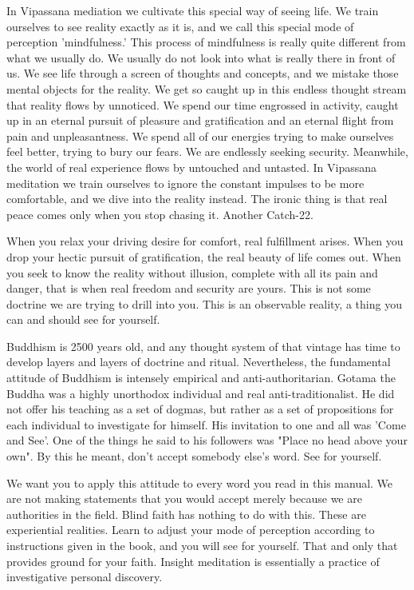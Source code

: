 In Vipassana mediation we cultivate this special way of seeing life. We train
ourselves to see reality exactly as it is, and we call this special mode of
perception 'mindfulness.' This process of mindfulness is really quite different
from what we usually do. We usually do not look into what is really there in
front of us. We see life through a screen of thoughts and concepts, and we
mistake those mental objects for the reality. We get so caught up in this
endless thought stream that reality flows by unnoticed. We spend our time
engrossed in activity, caught up in an eternal pursuit of pleasure and
gratification and an eternal flight from pain and unpleasantness. We spend all
of our energies trying to make ourselves feel better, trying to bury our fears.
We are endlessly seeking security. Meanwhile, the world of real experience flows
by untouched and untasted. In Vipassana meditation we train ourselves to ignore
the constant impulses to be more comfortable, and we dive into the reality
instead. The ironic thing is that real peace comes only when you stop chasing
it. Another Catch-22.

When you relax your driving desire for comfort, real fulfillment arises. When
you drop your hectic pursuit of gratification, the real beauty of life comes
out. When you seek to know the reality without illusion, complete with all its
pain and danger, that is when real freedom and security are yours. This is not
some doctrine we are trying to drill into you. This is an observable reality, a
thing you can and should see for yourself.

Buddhism is 2500 years old, and any thought system of that vintage has time to
develop layers and layers of doctrine and ritual.  Nevertheless, the fundamental
attitude of Buddhism is intensely empirical and anti-authoritarian. Gotama the
Buddha was a highly unorthodox individual and real anti-traditionalist. He did
not offer his teaching as a set of dogmas, but rather as a set of propositions
for each individual to investigate for himself. His invitation to one and all
was 'Come and See'. One of the things he said to his followers was "Place no
head above your own". By this he meant, don't accept somebody else's word. See
for yourself.

We want you to apply this attitude to every word you read in this manual. We are
not making statements that you would accept merely because we are authorities in
the field. Blind faith has nothing to do with this. These are experiential
realities. Learn to adjust your mode of perception according to instructions
given in the book, and you will see for yourself. That and only that provides
ground for your faith. Insight meditation is essentially a practice of
investigative personal discovery.

